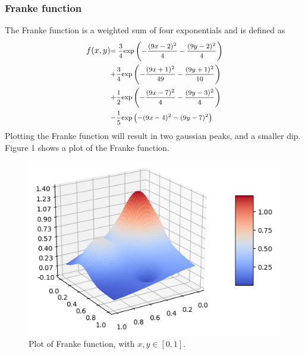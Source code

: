 \documentclass[a4paper,twocolumn]{article}
\begin{document}
\subsubsection{Franke function}
The Franke function is a weighted sum of four exponentials and is defined as
\begin{align*}
    \tiny
    f(x,y) &\text{\footnotesize$=  \frac{3}{4}\textrm{exp}\left(-\frac{(9x-2)^{2}}{4}-\frac{(9y-2)^{2}}{4}\right)$}\\ 
    &\text{\footnotesize$+ \frac{3}{4}\textrm{exp}\left(-\frac{(9x+1)^{2}}{49}-\frac{(9y+1)^{2}}{10}\right)$}\\
    &\text{\footnotesize$+ \frac{1}{2}\textrm{exp}\left(-\frac{(9x-7)^{2}}{4}-\frac{(9y-3)^{2}}{4}\right)$}\\
    &\text{\footnotesize$- \frac{1}{5}\textrm{exp}\left(-(9x-4)^{2}-(9y-7)^{2}\right)$}
\end{align*}
Plotting the Franke function will result in two gaussian peaks, and a smaller dip. Figure 1 shows a plot of the Franke function.
\begin{figure}[ht]
    \centering
    \includegraphics[scale=0.4]{franke.png}
    \caption{Plot of Franke function, with $x,y \in [0,1]$.}
\end{figure}
\end{document}
